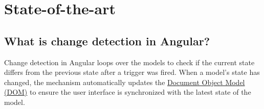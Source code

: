 \section{State-of-the-art}
\label{sec:state-of-the-art}
\subsection{What is change detection in Angular?}
\label{sec:change_detection_about}
Change detection in Angular loops over the models to check if the current state differs from the previous state after a trigger was fired. When a model's state has changed, the mechanism automatically updates the \href{https://en.wikipedia.org/wiki/Document_Object_Model}{Document Object Model (DOM)} to ensure the user interface is synchronized with the latest state of the model.
\autocite{Kumar2020}

